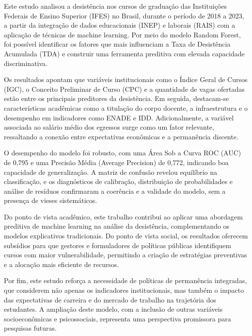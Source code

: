 Este estudo analisou a desistência nos cursos de graduação das Instituições Federais de Ensino Superior (IFES) no Brasil, durante o período de 2018 a 2023, a partir da integração de dados educacionais (INEP) e laborais (RAIS) com a aplicação de técnicas de machine learning. Por meio do modelo Random Forest, foi possível identificar os fatores que mais influenciam a Taxa de Desistência Acumulada (TDA) e construir uma ferramenta preditiva com elevada capacidade discriminativa.

Os resultados apontam que variáveis institucionais como o Índice Geral de Cursos (IGC), o Conceito Preliminar de Curso (CPC) e a quantidade de vagas ofertadas estão entre os principais preditores da desistência. Em seguida, destacam-se características acadêmicas como a titulação do corpo docente, a infraestrutura e o desempenho em indicadores como ENADE e IDD. Adicionalmente, a variável associada ao salário médio dos egressos surge como um fator relevante, ressaltando a conexão entre expectativas econômicas e a permanência discente.

O desempenho do modelo foi robusto, com uma Área Sob a Curva ROC (AUC) de 0,795 e uma Precisão Média (Average Precision) de 0,772, indicando boa capacidade de generalização. A matriz de confusão revelou equilíbrio na classificação, e os diagnósticos de calibração, distribuição de probabilidades e análise de resíduos confirmaram a coerência e a validade do modelo, sem a presença de vieses sistemáticos.

Do ponto de vista acadêmico, este trabalho contribui ao aplicar uma abordagem preditiva de machine learning na análise da desistência, complementando os modelos explicativos tradicionais. Do ponto de vista social, os resultados oferecem subsídios para que gestores e formuladores de políticas públicas identifiquem cursos com maior vulnerabilidade, permitindo a criação de estratégias preventivas e a alocação mais eficiente de recursos.

Por fim, este estudo reforça a necessidade de políticas de permanência integradas, que considerem não apenas os indicadores institucionais, mas também o impacto das expectativas de carreira e do mercado de trabalho na trajetória dos estudantes. A ampliação deste modelo, com a inclusão de outras variáveis socioeconômicas e psicossociais, representa uma perspectiva promissora para pesquisas futuras.

\postextual



